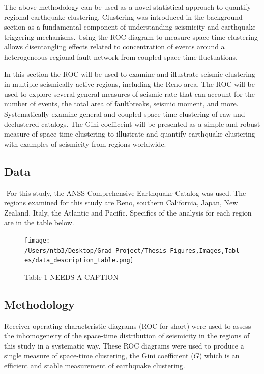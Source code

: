\documentclass[12pt]{article} %
\theoremstyle{plain}
\begin{document}
\label{sec:res}

The above methodology can be used as a novel statistical approach to quantify regional earthquake clustering. Clustering was introduced in the background section as a fundamental component of understanding seismicity and earthquake triggering mechanisms. Using the ROC diagram to measure space-time clustering allows disentangling effects related to concentration of events around a heterogeneous regional fault network from coupled space-time fluctuations. 

In this section the ROC will be used to examine and illustrate seismic clustering in multiple seismically active regions, including the Reno area. The ROC will be used to explore several general measures of seismic rate that can account for the number of events, the total area of faultbreaks, seismic moment, and more. Systematically examine general and coupled space-time clustering of raw and declustered catalogs. The Gini coefficeint will be presented as a simple and robust measure of space-time clustering to illustrate and quantify earthquake clustering with examples of seismicity from regions worldwide.


\subsection{Data}
​​
For this study, the ANSS Comprehensive Earthquake Catalog was used. The regions examined for this study are Reno, southern California, Japan, New Zealand, Italy, the Atlantic and Pacific. Specifics of the analysis for each region are in the table below.



\begin{figure} [!htbp]
	\centering
	\texttt{[image:  /Users/ntb3/Desktop/Grad\_Project/Thesis\_Figures,Images,Tables/data\_description\_table.png]}
	\caption{Table 1 NEEDS A CAPTION	}
	\label{fig:data_table}
\end{figure}


\subsection{Methodology}
Receiver operating characteristic diagrams (ROC for short) were used to assess the inhomogeneity of the space-time distribution of seismicity in the regions of this study in a systematic way. These ROC diagrams were used to produce a single measure of space-time clustering, the Gini coefficient ($G$) which is an efficient and stable measurement of earthquake clustering.
\end{document}
